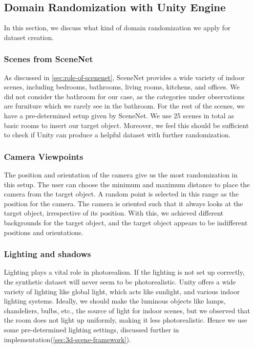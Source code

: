 \subsection{Domain Randomization with Unity Engine}\label{subsec:domain-randomisation-with-unity-engine}
In this section, we discuss what kind of domain randomization we apply for dataset creation.

\subsubsection{Scenes from SceneNet}\label{subsubsec:scenes-from-scenenet}
As discussed in \autoref{sec:role-of-scenenet}, SceneNet provides a wide variety of indoor scenes, including bedrooms, bathrooms, living rooms, kitchens, and offices.
We did not consider the bathroom for our case, as the categories under observations are furniture which we rarely see in the bathroom.
For the rest of the scenes, we have a pre-determined setup given by SceneNet.
We use 25 scenes in total as basic rooms to insert our target object.
Moreover, we feel this should be sufficient to check if Unity can produce a helpful dataset with further randomization.

\subsubsection{Camera Viewpoints}
The position and orientation of the camera give us the most randomization in this setup.
The user can choose the minimum and maximum distance to place the camera from the target object.
A random point is selected in this range as the position for the camera.
The camera is oriented such that it always looks at the target object, irrespective of its position.
With this, we achieved different backgrounds for the target object, and the target object appears to be indifferent positions and orientations.

\subsubsection{Lighting and shadows}
Lighting plays a vital role in photorealism.
If the lighting is not set up correctly, the synthetic dataset will never seem to be photorealistic.
Unity offers a wide variety of lighting like global light, which acts like sunlight, and various indoor lighting systems.
Ideally, we should make the luminous objects like lamps, chandeliers, bulbs, etc.,
the source of light for indoor scenes, but we observed that the room does not light up uniformly,
making it less photorealistic.
Hence we use some pre-determined lighting settings, discussed further in implementation(\autoref{sec:3d-scene-framework}).

